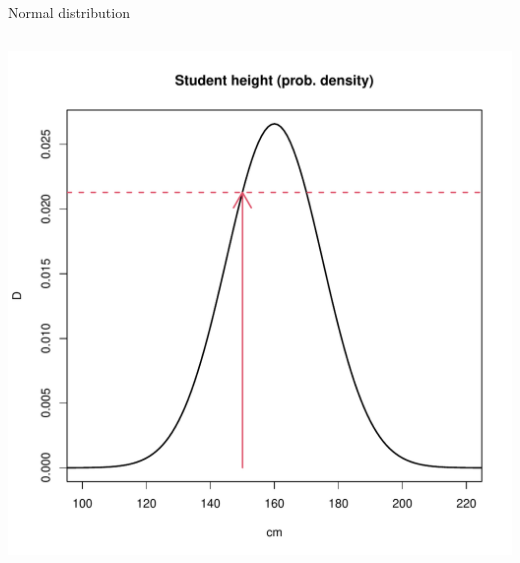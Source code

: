 \documentclass[aspectratio=169]{beamer}\usepackage[]{graphicx}\usepackage[]{color}
\makeatletter
\def\maxwidth{ %
  \ifdim\Gin@nat@width>\linewidth
    \linewidth
  \else
    \Gin@nat@width
  \fi
}
\newenvironment{knitrout}{}{} %
\makeatother
\begin{document}
\begin{frame}[fragile]{Normal distribution}
\begin{columns}
\begin{column}{0.5\textwidth}
\begin{knitrout}
\includegraphics[width=\maxwidth]{figure/unnamed-chunk-12-1} 

\end{knitrout}
  \end{column}
\end{columns}
\end{frame}
\end{document}
